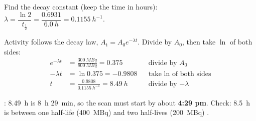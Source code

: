 \begin{modelanswer}
 Find the decay constant (keep the time in hours):
$\lambda = \dfrac{\ln 2}{t_{\frac{1}{2}}} = \dfrac{0.6931}{\qty{6.0}{h}}
= \qty{0.1155}{h^{-1}}$.

 Activity follows the decay law, $A_\mathrm{t} = A_0 e^{-\lambda t}$. Divide by
$A_0$, then take $\ln$ of both sides:
\begin{align*}
  e^{-\lambda t} &= \frac{\qty{300}{MBq}}{\qty{800}{MBq}} = 0.375 && \text{divide by $A_0$}\\
  -\lambda t &= \ln 0.375 = -0.9808 && \text{take $\ln$ of both sides}\\
  t &= \frac{0.9808}{\qty{0.1155}{h^{-1}}} = \qty{8.49}{h} && \text{divide by $-\lambda$}
\end{align*}

 : \qty{8.49}{h} is 8~h 29~min, so the scan must
start by about \textbf{4:29 pm}. Check: \qty{8.5}{h} is between one half-life
(\qty{400}{MBq}) and two half-lives (\qty{200}{MBq}) \cmark.
\end{modelanswer}

\begin{markingcriteria}
\end{markingcriteria}
